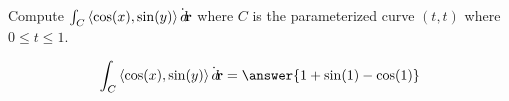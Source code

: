 \documentclass{ximera}
\author{David Guichard \and Neal Koblitz \and H. Jerome Keisler \and Albert Scheller \and Barry Balof \and Mike Wills \and Matthew Carr}
\begin{document}
\begin{exercise}




Compute $\int_C \left\langle \cos(x),\sin(y)\right\rangle\dot{\mathop{}\!d\!}\mathbf{r}$ where $C$ is the parameterized curve $(t,t)$ where $0\le t\le 1$.

\begin{prompt}
\[
\int_C \vector{\cos(x),\sin(y)}\dot\d\vec{r}=\answer{1+\sin(1)-\cos(1)}
\]
\end{prompt}



\end{exercise}
\end{document}

